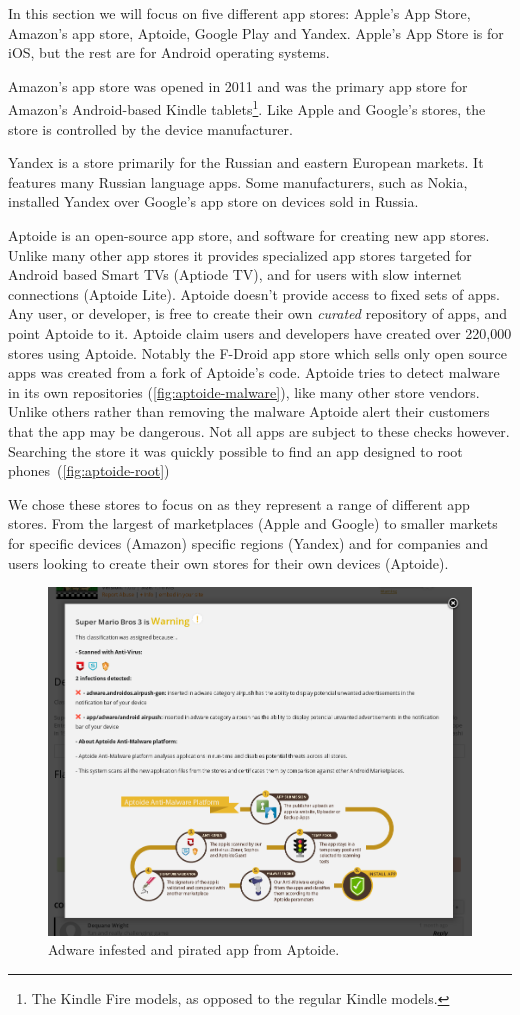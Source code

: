 \documentclass[thesis.tex]{subfiles}
\begin{document}
In this section we will focus on five different app stores: Apple's App Store,
Amazon's app store, Aptoide, Google Play and Yandex. Apple's App Store is for
iOS, but the rest are for Android operating systems.

Amazon's app store was opened in 2011 and was the primary app store
for Amazon's Android-based Kindle tablets\footnote{The Kindle Fire
models, as opposed to the regular Kindle models.}. Like Apple and
Google's stores, the store is controlled by the device manufacturer.

Yandex is a store primarily for the Russian and eastern European markets. It
features many Russian language apps. Some manufacturers, such as Nokia,
installed Yandex over Google's app store on devices sold in Russia.

Aptoide is an open-source app store, and software for creating new app stores.
Unlike many other app stores it provides specialized app stores targeted for
Android based Smart TVs (Aptiode TV), and for users with slow internet
connections (Aptoide Lite). Aptoide doesn't provide access to fixed sets of
apps. Any user, or developer, is free to create their own \emph{curated}
repository of apps, and point Aptoide to it. Aptoide claim users and developers
have created over 220,000 stores using Aptoide. Notably the F-Droid app store
which sells only open source apps was created from a fork of Aptoide's code.
Aptoide tries to detect malware in its own repositories
(\autoref{fig:aptoide-malware}), like many other store vendors. Unlike others
rather than removing the malware Aptoide alert their customers that the app may
be dangerous. Not all apps are subject to these checks however. Searching the
store it was quickly possible to find an app designed to root
phones~(\autoref{fig:aptoide-root})

We chose these stores to focus on as they represent a range of different app
stores. From the largest of marketplaces (Apple and Google) to smaller
markets for specific devices (Amazon) specific regions (Yandex) and for
companies and users looking to create their own stores for their own devices
(Aptoide).

\begin{figure}
  \centering
  \includegraphics[width=0.8\linewidth]{figures/aptoide-malware.png}
  \caption{Adware infested and pirated app from Aptoide.}
  \label{fig:aptoide-malware}
\end{figure}
\end{document}
